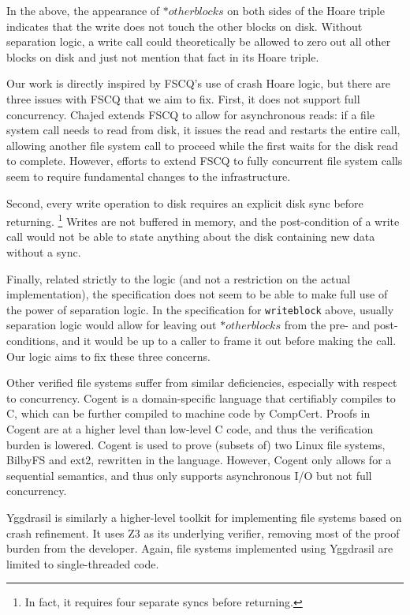 In the above, the appearance of $\ast otherblocks$ on both sides of the Hoare
triple indicates that the write does not touch the other blocks on
disk.
Without
separation logic, a write call could theoretically be allowed to zero out all
other blocks on disk and just not mention that fact in its Hoare triple.

Our work is directly inspired by FSCQ's use of crash Hoare logic, but there are
three issues with FSCQ that we aim to fix.
First, it does not support full
concurrency.
Chajed \cite{chajed2017verifying} extends FSCQ to allow for
asynchronous reads: if a file system call needs to read from disk, it issues the
read and restarts the entire call, allowing another file system call to proceed
while the first waits for the disk read to complete.
However, efforts to extend
FSCQ to fully concurrent file system calls seem to require fundamental changes
to the infrastructure.

Second, every write operation to disk requires an explicit disk sync before
returning.
\footnote{In fact, it requires four separate syncs before returning.}
Writes are not buffered in memory, and the post-condition of a write call would
not be able to state anything about the disk containing new data without a sync.

Finally, related strictly to the logic (and not a restriction on the actual
implementation), the specification does not seem to be able to make full use of
the power of separation logic.
In the specification for \texttt{writeblock}
above, usually separation logic would allow for leaving out $\ast otherblocks$
from the pre- and post-conditions, and it would be up to a caller to frame it
out before making the call.
Our logic aims to fix these three concerns.

Other verified file systems suffer from similar deficiencies, especially with
respect to concurrency.
Cogent\cite{amani2016cogent} is a domain-specific
language that certifiably compiles to C, which can be further compiled to
machine code by CompCert.
Proofs in Cogent are at a higher level than low-level
C code, and thus the verification burden is lowered.
Cogent is used to prove
(subsets of) two Linux file systems, BilbyFS and ext2, rewritten in the
language.
However, Cogent only allows for a sequential semantics, and thus only
supports asynchronous I/O but not full concurrency.

Yggdrasil\cite{sigurbjarnarson2016push} is similarly a higher-level toolkit for
implementing file systems based on crash refinement.
It uses Z3 as its underlying
verifier, removing most of the proof burden from the developer.
Again, file
systems implemented using Yggdrasil are limited to single-threaded code.

